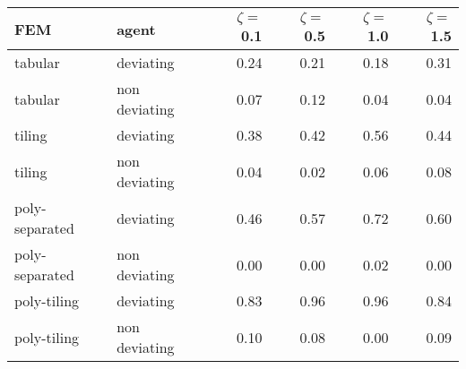 \begin{tabular}{llrrrr}
  \hline
FEM & agent & $\zeta =$ 0.1 & $\zeta =$ 0.5 & $\zeta =$ 1.0 & $\zeta =$ 1.5 \\ 
  \hline
tabular & deviating & 0.24 & 0.21 & 0.18 & 0.31 \\ 
  tabular & non deviating & 0.07 & 0.12 & 0.04 & 0.04 \\ 
  tiling & deviating & 0.38 & 0.42 & 0.56 & 0.44 \\ 
  tiling & non deviating & 0.04 & 0.02 & 0.06 & 0.08 \\ 
  poly-separated & deviating & 0.46 & 0.57 & 0.72 & 0.60 \\ 
  poly-separated & non deviating & 0.00 & 0.00 & 0.02 & 0.00 \\ 
  poly-tiling & deviating & 0.83 & 0.96 & 0.96 & 0.84 \\ 
  poly-tiling & non deviating & 0.10 & 0.08 & 0.00 & 0.09 \\ 
   \hline
\end{tabular}
